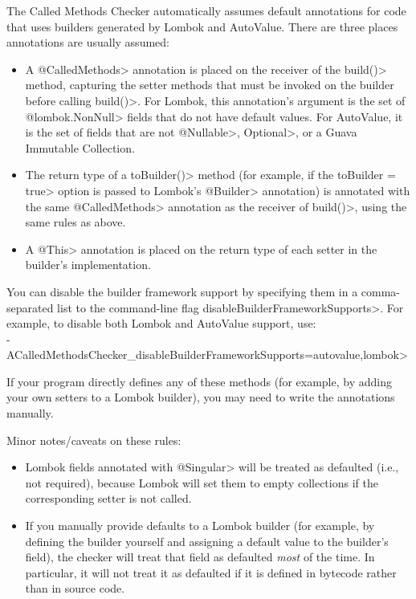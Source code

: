 The Called Methods Checker automatically assumes default annotations for code that uses builders generated
by Lombok and AutoValue. There are three places annotations are usually assumed:
\begin{itemize}
\item A \<@CalledMethods> annotation is placed on the receiver of the \<build()> method, capturing the
setter methods that must be invoked on the builder before calling \<build()>. For Lombok,
this annotation's argument is the set of \<@lombok.NonNull> fields that do not have default values.
For AutoValue, it is the set of fields that are not \<@Nullable>, \<Optional>, or a Guava Immutable
Collection.
\item The return type of a \<toBuilder()> method (for example, if the \<toBuilder = true> option is
passed to Lombok's \<@Builder> annotation) is annotated with
the same \<@CalledMethods> annotation as the receiver of \<build()>, using the same rules as above.
\item A \<@This> annotation is placed on the return type of each setter in the builder's implementation.
\end{itemize}

You can disable the builder framework support by specifying them in a comma-separated list to the
command-line flag \<disableBuilderFrameworkSupports>.  For example, to disable both Lombok and AutoValue support,
use: \\ \<-ACalledMethodsChecker\_disableBuilderFrameworkSupports=autovalue,lombok>

If your program directly defines any of these methods (for example, by adding your own setters to
a Lombok builder), you may need to write the annotations manually.

Minor notes/caveats on these rules:
\begin{itemize}
\item Lombok fields annotated with \<@Singular> will be treated as defaulted (i.e., not required), because
Lombok will set them to empty collections if the corresponding setter is not called.
\item If you manually provide defaults to a Lombok builder (for example, by defining the builder yourself
and assigning a default value to the builder's field), the checker will treat that field as defaulted
\emph{most} of the time. In particular, it will not treat it as defaulted if it is defined in bytecode rather
than in source code.
\end{itemize}


